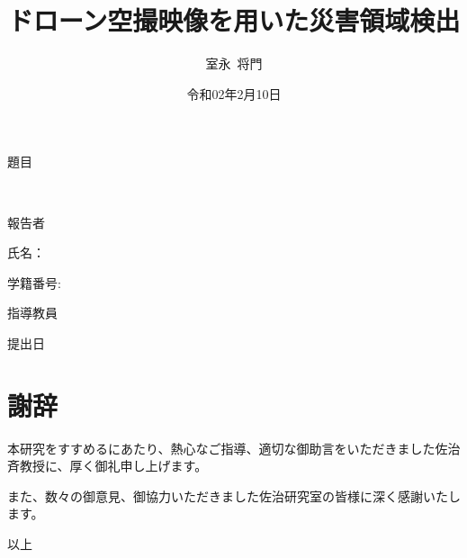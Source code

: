 \documentclass[xelatex, a4paper, 10pt, titlepage, ja=standard, Ligatures=TeX, precisetext]{bxjsreport}
\title{ドローン空撮映像を用いた災害領域検出}
\author{室永\ 将門}
\date{令和02年2月10日}
\makeatletter
\renewcommand{\maketitle}{
      \vspace*{20mm}
      \begin{center}
        {\huge \@thesis \par}
        \vspace{10mm}
        {\huge 題目 \par}
        {\huge\ \@title \par}
        \vspace{10mm}
        {\LARGE 報告者 \par}
        {\LARGE 氏名：\ \@author \par}
        {\LARGE 学籍番号:\ \@id \par}
        \vspace{10mm}
        {\LARGE 指導教員 \par}
        {\LARGE \@teacher \par}
        \vspace{20mm}
        {\Large 提出日 \par}
        {\Large \@date \par}
        {\Large \@department \par}
      \end{center}
    }
\makeatother
\begin{document}
  \begin{titlepage}
    \maketitle
  \end{titlepage}


  \tableofcontents

  
  
  
  

  
  

  \chapter*{謝辞} %
    \label{cha:謝辞}

    本研究をすすめるにあたり、熱心なご指導、適切な御助言をいただきました佐治斉教授に、厚く御礼申し上げます。

    また、数々の御意見、御協力いただきました佐治研究室の皆様に深く感謝いたします。

    \vspace*{3ex}
    \begin{flushright}
      以上
    \end{flushright}
\end{document}
